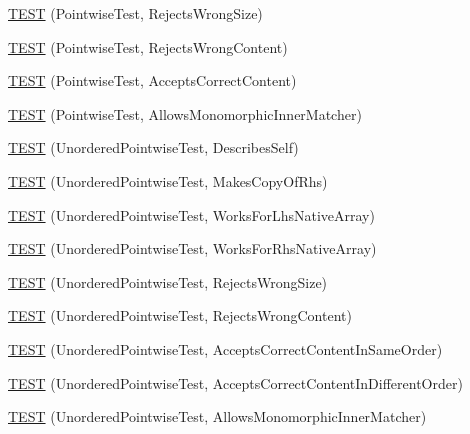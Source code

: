 \begin{DoxyCompactItemize}
\hyperlink{namespacetesting_1_1gmock__matchers__test_a1f73a8fa9dd9560bd606a990444a81fe}{T\+E\+ST} (Pointwise\+Test, Rejects\+Wrong\+Size)
\item 
\hyperlink{namespacetesting_1_1gmock__matchers__test_a135ad7162da91c9a234193fbbe5ef775}{T\+E\+ST} (Pointwise\+Test, Rejects\+Wrong\+Content)
\item 
\hyperlink{namespacetesting_1_1gmock__matchers__test_a42b98b370f1897cecfafbbfba53f4f38}{T\+E\+ST} (Pointwise\+Test, Accepts\+Correct\+Content)
\item 
\hyperlink{namespacetesting_1_1gmock__matchers__test_a9bbef6d651166c37af32c54923bcd849}{T\+E\+ST} (Pointwise\+Test, Allows\+Monomorphic\+Inner\+Matcher)
\item 
\hyperlink{namespacetesting_1_1gmock__matchers__test_af3307f88a321331155a146d49974e3e3}{T\+E\+ST} (Unordered\+Pointwise\+Test, Describes\+Self)
\item 
\hyperlink{namespacetesting_1_1gmock__matchers__test_a05e9bbee9d19692f45a846c2ff45e016}{T\+E\+ST} (Unordered\+Pointwise\+Test, Makes\+Copy\+Of\+Rhs)
\item 
\hyperlink{namespacetesting_1_1gmock__matchers__test_a57e330a5ae600f65d4daa2ed57bbc887}{T\+E\+ST} (Unordered\+Pointwise\+Test, Works\+For\+Lhs\+Native\+Array)
\item 
\hyperlink{namespacetesting_1_1gmock__matchers__test_ae75a933b86db4c43a7bec2ffa97692ef}{T\+E\+ST} (Unordered\+Pointwise\+Test, Works\+For\+Rhs\+Native\+Array)
\item 
\hyperlink{namespacetesting_1_1gmock__matchers__test_a50412d02c70f8303a087e6832d26ba62}{T\+E\+ST} (Unordered\+Pointwise\+Test, Rejects\+Wrong\+Size)
\item 
\hyperlink{namespacetesting_1_1gmock__matchers__test_a9a9a85c6598ab74463703acbd01aa1a7}{T\+E\+ST} (Unordered\+Pointwise\+Test, Rejects\+Wrong\+Content)
\item 
\hyperlink{namespacetesting_1_1gmock__matchers__test_aa68bf48e4a8fa41fcd60f59cc60ede8f}{T\+E\+ST} (Unordered\+Pointwise\+Test, Accepts\+Correct\+Content\+In\+Same\+Order)
\item 
\hyperlink{namespacetesting_1_1gmock__matchers__test_a3d48732b4a6069cfcf5c0dde6027dad5}{T\+E\+ST} (Unordered\+Pointwise\+Test, Accepts\+Correct\+Content\+In\+Different\+Order)
\item 
\hyperlink{namespacetesting_1_1gmock__matchers__test_af16d28a9f3a07b8ef2962b868b4f8399}{T\+E\+ST} (Unordered\+Pointwise\+Test, Allows\+Monomorphic\+Inner\+Matcher)
\end{DoxyCompactItemize}
